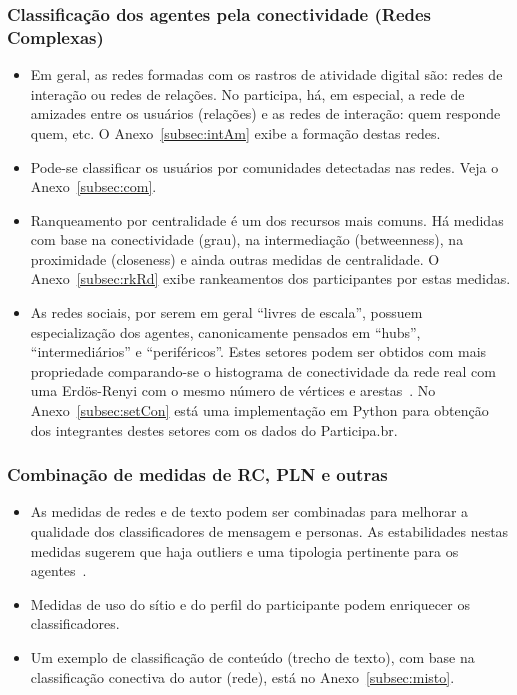 \documentclass[12pt]{article}
\begin{document}
\subsubsection{Classificação dos agentes pela conectividade (Redes Complexas)}
\begin{itemize}
    \item Em geral, as redes formadas com os rastros de atividade digital são: redes de interação ou redes de relações. No participa, há, em especial, a rede de amizades entre os usuários (relações) e as redes de interação: quem responde quem, etc. O Anexo~\ref{subsec:intAm} exibe a formação destas redes.
    \item Pode-se classificar os usuários por comunidades detectadas nas redes. Veja o Anexo~\ref{subsec:com}.
    \item Ranqueamento por centralidade é um dos recursos mais comuns. Há medidas com base na conectividade (grau), na intermediação (betweenness), na proximidade (closeness) e ainda outras medidas de centralidade. O Anexo~\ref{subsec:rkRd} exibe rankeamentos dos participantes por estas medidas.
    \item As redes sociais, por serem em geral “livres de escala”, possuem especialização dos agentes, canonicamente pensados em “hubs”, “intermediários” e “periféricos”. Estes setores podem ser obtidos com mais propriedade comparando-se o histograma de conectividade da rede real com uma Erdös-Renyi com o mesmo número de vértices e arestas~\cite{fabbri1,fabbri2}. No Anexo~\ref{subsec:setCon} está uma implementação em Python para obtenção dos integrantes destes setores com os dados do Participa.br.
\end{itemize}
\subsubsection{Combinação de medidas de RC, PLN e outras}
\begin{itemize}
    \item As medidas de redes e de texto podem ser combinadas para melhorar a qualidade dos classificadores de mensagem e personas. As estabilidades nestas medidas sugerem que haja outliers e uma tipologia pertinente para os agentes~\cite{fabbri1, fabbri2}.
    \item Medidas de uso do sítio e do perfil do participante podem enriquecer os classificadores.
    \item Um exemplo de classificação de conteúdo (trecho de texto), com base na classificação conectiva do autor (rede), está no Anexo~\ref{subsec:misto}.
\end{itemize}
\end{document}

